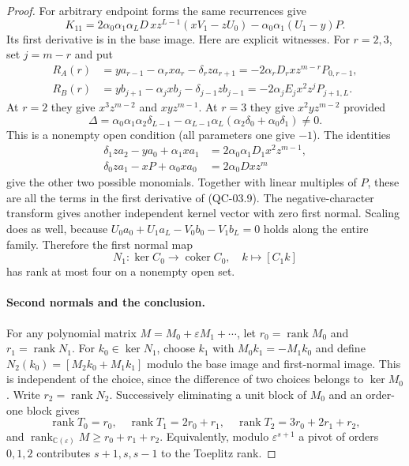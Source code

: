 \begin{proof}
For arbitrary endpoint forms the same recurrences give
\[
 K_{11}=2\alpha_0\alpha_1\alpha_LD\,
    xz^{L-1}(xV_1-zU_0)-\alpha_0\alpha_1(U_1-y)P.
 \tag{QC-03.9}
\]
Its first derivative is in the base image. Here are explicit
witnesses. For $r=2,3$, set $j=m-r$ and put
\begin{align*}
 R_A(r)&=ya_{r-1}-\alpha_rxa_r-\delta_rza_{r+1}
        =-2\alpha_rD_r xz^{m-r}P_{0,r-1},\\
 R_B(r)&=yb_{j+1}-\alpha_jxb_j-\delta_{j-1}zb_{j-1}
        =-2\alpha_jE_j x^2z^jP_{j+1,L}.
\end{align*}
At $r=2$ they give $x^3z^{m-2}$ and $xyz^{m-1}$.
At $r=3$ they give $x^2yz^{m-2}$ provided
\[
 \Delta=\alpha_0\alpha_1\alpha_2\delta_{L-1}
       -\alpha_{L-1}\alpha_L(\alpha_2\delta_0+\alpha_0\delta_1)
       \ne0.
\]
This is a nonempty open condition (all parameters one give $-1$).
The identities
\begin{align*}
\delta_1za_2-ya_0+\alpha_1xa_1
 &=2\alpha_0\alpha_1D_1x^2z^{m-1},\\
\delta_0za_1-xP+\alpha_0xa_0&=2\alpha_0D xz^m
\end{align*}
give the other two possible monomials. Together with linear
multiples of $P$, these are all the terms in the first derivative
of (QC-03.9). The negative-character transform gives another
independent kernel vector with zero first normal. Scaling does
as well, because
$U_0a_0+U_1a_L-V_0b_0-V_1b_L=0$ holds along the entire family.
Therefore the first normal map
\[
 N_1:\ker C_0\longrightarrow\operatorname{coker}C_0,
             \quad k\longmapsto[C_1k]
\]
has rank at most four on a nonempty open set.

\paragraph{Second normals and the conclusion.}
For any polynomial matrix $M=M_0+\varepsilon M_1+\cdots$, let
$r_0=\operatorname{rank}M_0$ and $r_1=\operatorname{rank}N_1$.
For $k_0\in\ker N_1$, choose $k_1$ with
$M_0k_1=-M_1k_0$ and define
$N_2(k_0)=[M_2k_0+M_1k_1]$ modulo the base image and first-normal
image. This is independent of the choice, since the difference
of two choices belongs to $\ker M_0$. Write $r_2=\operatorname{rank}N_2$.
Successively eliminating a unit block of $M_0$ and an order-one
block gives
\[
 \operatorname{rank}T_0=r_0,\quad
 \operatorname{rank}T_1=2r_0+r_1,\quad
 \operatorname{rank}T_2=3r_0+2r_1+r_2,
\]
and $\operatorname{rank}_{\mathbb C(\varepsilon)}M\geq r_0+r_1+r_2$.
Equivalently, modulo $\varepsilon^{s+1}$ a pivot of orders
$0,1,2$ contributes $s+1,s,s-1$ to the Toeplitz rank.


\end{proof}
